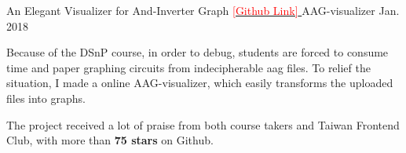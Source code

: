 \begin{cventries}
  \cventry
    {An Elegant Visualizer for And-Inverter Graph \href{https://github.com/ByronHsu/AAG-Visualizer}{ \textcolor{red}{[Github Link]} }} %
    {AAG-visualizer} %
    {} %
    {Jan. 2018} %
    {
      \begin{cvitems} %
        \item {Because of the DSnP course, in order to debug, students are forced to consume time and paper graphing circuits from indecipherable aag files. To relief the situation, I made a online AAG-visualizer, which easily transforms the uploaded files into graphs.}
        \item {The project received a lot of praise from both course takers and Taiwan Frontend Club, with more than \textbf{75 stars} on Github.}
      \end{cvitems}
    }
\end{cventries}
